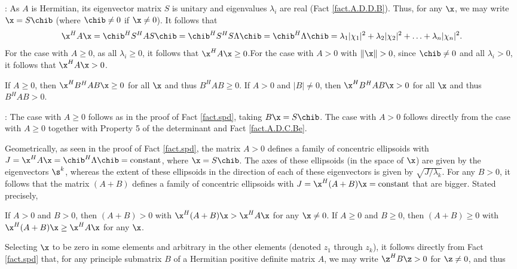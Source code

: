 \/: As $A$ is Hermitian, its eigenvector matrix $S$
is unitary and eigenvalues $\lambda_{i}$ are real (Fact \ref{fact.A.D.D.B}).
Thus, for any $\x$, we may write $\x=S\chib$ (where $\chib\ne 0$ if
$\x\ne 0$).  It follows that
\begin{equation*}
    \x^{H} A \x= \chib^{H} S^{H} A S \chib =
\chib^{H} S^{H} S \Lambda \chib = \chib^{H} \Lambda \chib =
\lambda_{1} |\chi_{1}|^{2} + \lambda_{2} |\chi_{2}|^{2} + \ldots +
\lambda_{n} |\chi_{n}|^{2}.
\end{equation*}
For the case with $A\ge 0$, as all $\lambda_{i}\ge 0$, it follows that
$\x^{H} A \x \ge 0$.\hfill\break For the case with $A> 0$ with $\Vert
\x \Vert>0$, since $\chib\ne 0$ and all $\lambda_{i}>0$, it follows
that $\x^{H} A \x >0$.   \endproof \medskip

\begin{fact} \label{fact.A.D.D.Ea}
If $A\ge 0$, then $\x^{H} B^H A B\x \ge 0$ for all $\x$ and thus $B^H A B \ge 0$.  If $A>0$ and $|B|\ne 0$, then $\x^{H} B^H A B\x > 0$ for all $\x$
and thus $B^H A B > 0$.
\end{fact}

\/: The case with $A\ge 0$ follows as in the proof of Fact \ref{fact.spd},
taking $B\x=S\chib$.  The case with $A>0$ follows directly from the case with $A\ge 0$ together
with Property 5 of the determinant and Fact \ref{fact.A.D.C.Be}.\endproof \medskip

Geometrically, as seen in the proof of Fact \ref{fact.spd},
the matrix $A>0$ defines a family of concentric ellipsoids with $J=\x^H A \x = \chib^{H} \Lambda \chib = \textrm{constant}$, where $\x=S\chib$.
The axes of these ellipsoids (in the space of $\x$) are given by the eigenvectors $\s^k$, whereas the extent of these ellipsoids in the direction
of each of these eigenvectors is given by $\sqrt{J/\lambda_k}$.
For any $B>0$, it follows that the matrix $(A+B)$ defines a family of concentric ellipsoids with $J=\x^H (A+B) \x = \textrm{constant}$
that are bigger.  Stated precisely,

\begin{fact} \label{fact.A.D.D.Eb}
If $A> 0$ and $B>0$, then $(A+B)>0$ with $\x^H (A+B) \x > \x^H A \x$ for any $\x\ne 0$.\hfill\break
If $A\ge 0$ and $B\ge 0$, then $(A+B)\ge 0$ with $\x^H (A+B) \x \ge \x^H A \x$ for any $\x$.
\end{fact}

Selecting $\x$ to be zero in some elements and arbitrary in the other elements (denoted $z_1$ through $z_k$), it follows directly from
Fact \ref{fact.spd} that, for any principle submatrix $B$ of a Hermitian positive definite matrix $A$, we may write $\z^H B \z > 0$ for $\z\ne 0$, and thus

